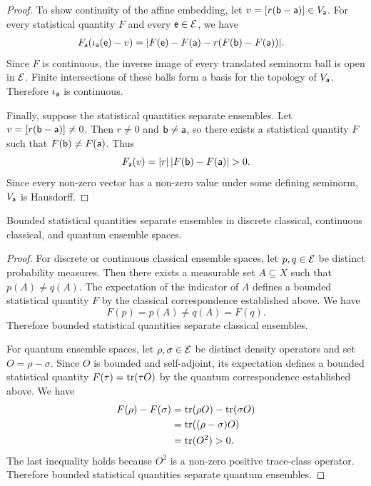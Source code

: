 \begin{mathSection}
\begin{proof}
	To show continuity of the affine embedding, let $v=[r(\ens[b]-\ens[a])] \in V_{\ens[a]}$. For every statistical quantity $F$ and every $\ens \in \Ens$, we have
	\begin{equation}
		\begin{aligned}
			F_{\ens[a]}(\iota_{\ens[a]}(\ens)-v)
			&= |F(\ens)-F(\ens[a])-r(F(\ens[b])-F(\ens[a]))|.
		\end{aligned}
	\end{equation}
	Since $F$ is continuous, the inverse image of every translated seminorm ball is open in $\Ens$. Finite intersections of these balls form a basis for the topology of $V_{\ens[a]}$. Therefore $\iota_{\ens[a]}$ is continuous.
	
	Finally, suppose the statistical quantities separate ensembles. Let $v=[r(\ens[b]-\ens[a])] \neq 0$. Then $r\neq0$ and $\ens[b]\neq\ens[a]$, so there exists a statistical quantity $F$ such that $F(\ens[b])\neq F(\ens[a])$. Thus
	\begin{equation}
		F_{\ens[a]}(v)=|r|\,|F(\ens[b])-F(\ens[a])|>0.
	\end{equation}
	Since every non-zero vector has a non-zero value under some defining seminorm, $V_{\ens[a]}$ is Hausdorff.
\end{proof}

\begin{prop}
	Bounded statistical quantities separate ensembles in discrete classical, continuous classical, and quantum ensemble spaces.
\end{prop}
\begin{proof}
	For discrete or continuous classical ensemble spaces, let $p,q \in \Ens$ be distinct probability measures. Then there exists a measurable set $A \subseteq X$ such that $p(A)\neq q(A)$. The expectation of the indicator of $A$ defines a bounded statistical quantity $F$ by the classical correspondence established above. We have
	\begin{equation}
		F(p)=p(A)\neq q(A)=F(q).
	\end{equation}
	Therefore bounded statistical quantities separate classical ensembles.
	
	For quantum ensemble spaces, let $\rho,\sigma \in \Ens$ be distinct density operators and set $O=\rho-\sigma$. Since $O$ is bounded and self-adjoint, its expectation defines a bounded statistical quantity $F(\tau)=\tr(\tau O)$ by the quantum correspondence established above. We have
	\begin{equation}
		\begin{aligned}
			F(\rho)-F(\sigma)
			&= \tr(\rho O)-\tr(\sigma O) \\
			&= \tr((\rho-\sigma)O) \\
			&= \tr(O^2)>0.
		\end{aligned}
	\end{equation}
	The last inequality holds because $O^2$ is a non-zero positive trace-class operator. Therefore bounded statistical quantities separate quantum ensembles.
\end{proof}
\end{mathSection}


